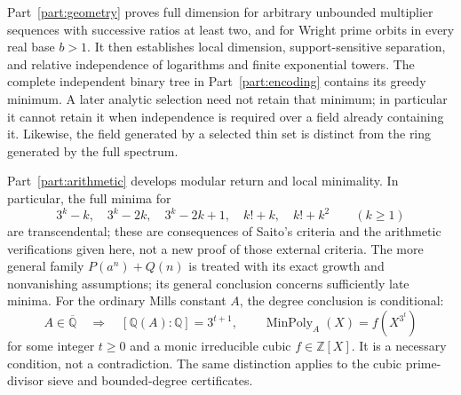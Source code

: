 \documentclass[11pt,a4paper]{article}
\theoremstyle{definition}
\theoremstyle{remark}
\numberwithin{equation}{section}
\begin{document}
Part~\ref{part:geometry} proves full dimension for arbitrary unbounded
multiplier sequences with successive ratios at least two, and for Wright
prime orbits in every real base $b>1$. It then establishes local dimension,
support-sensitive separation, and relative independence of logarithms and
finite exponential towers. The complete independent binary tree in
Part~\ref{part:encoding} contains its greedy minimum. A later analytic
selection need not retain that minimum; in particular it cannot retain
it when independence is required over a field already containing it.
Likewise, the field generated by a selected thin set is distinct from
the ring generated by the full spectrum.

Part~\ref{part:arithmetic} develops modular return and local minimality.
In particular, the full minima for
\[
 3^k-k,\quad 3^k-2k,\quad 3^k-2k+1,\quad k!+k,\quad k!+k^2
 \qquad(k\ge1)
\]
are transcendental; these are consequences of Saito's criteria and the
arithmetic verifications given here, not a new proof of those external
criteria. The more general family $P(a^n)+Q(n)$ is treated with its exact
growth and nonvanishing assumptions; its general conclusion concerns
sufficiently late minima. For the ordinary Mills constant $A$, the
degree conclusion is conditional:
\[
 A\in\overline{\mathbb Q}\quad\Longrightarrow\quad
 [\mathbb Q(A):\mathbb Q]=3^{t+1},\qquad
 \operatorname{MinPoly}_A(X)=f(X^{3^t})
\]
for some integer $t\ge0$ and a monic irreducible cubic $f\in\mathbb Z[X]$.
It is a necessary condition, not a contradiction. The same distinction
applies to the cubic prime-divisor sieve and bounded-degree certificates.
\end{document}
